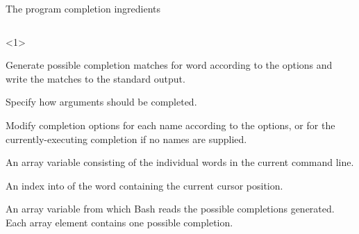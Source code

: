 \begin{frame}{The program completion ingredients}
    \vspace{-6mm}
    \begin{columns}
        \begin{column}{\dimexpr\paperwidth-18mm}
            \begin{onlyenv}<1>
                \begin{description}
                    \setlength{\itemsep}{2mm}
                    \item[\PB{\texttt{compgen}}]
                        Generate possible completion matches for word according to the options and write the matches to the standard output.
                    \item[\PB{\texttt{complete}}]
                        Specify how arguments should be completed.
                    \item[\PB{\texttt{compopt}}]
                        Modify completion options for each name according to the options, or for the currently-executing completion if no names are supplied.\\[6mm]
                    \item[\PB{\texttt{COMP\_WORDS}}]
                        An array variable consisting of the individual words in the current command line.
                    \item[\PB{\texttt{COMP\_CWORD}}]
                        An index into  of the word containing the current cursor position.
                    \item[\PB{\texttt{COMPREPLY}}]
                        An array variable from which Bash reads the possible completions generated. Each array element contains one possible completion.
                \end{description}
            \end{onlyenv}
        \end{column}
    \end{columns}
    \PrepareURLsymbol[PB]
\end{frame}
